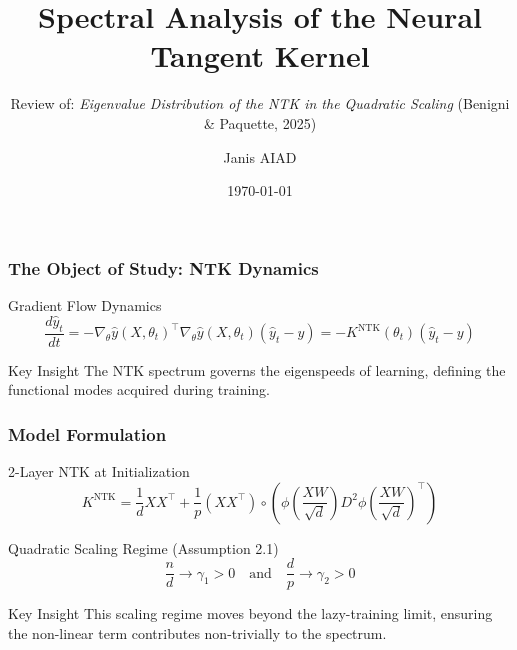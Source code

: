\documentclass[10pt]{beamer}
\title{Spectral Analysis of the Neural Tangent Kernel}
\subtitle{Review of: \textit{Eigenvalue Distribution of the NTK in the Quadratic Scaling} (Benigni \& Paquette, 2025)}
\author{Janis AIAD}
\institute{UMD}
\date{\today}
\begin{document}
\begin{frame}
    \titlepage
\end{frame}

\begin{frame}
    \frametitle{The Object of Study: NTK Dynamics}
    \begin{block}{Gradient Flow Dynamics}
        \begin{equation*}
            \frac{d\hat{y}_t}{dt} = - \nabla_\theta \hat{y}(X, \theta_t)^\top \nabla_\theta \hat{y}(X, \theta_t) (\hat{y}_t - y) = -K^{\text{NTK}}(\theta_t) (\hat{y}_t - y)
        \end{equation*}
    \end{block}
    \vspace{1cm}
    \begin{alertblock}{Key Insight}
    The NTK spectrum governs the eigenspeeds of learning, defining the functional modes acquired during training.
    \end{alertblock}
\end{frame}

\begin{frame}
    \frametitle{Model Formulation}
    \begin{block}{2-Layer NTK at Initialization}
        \begin{equation*}
            K^{\text{NTK}} = \frac{1}{d} XX^\top + \frac{1}{p} (XX^\top) \circ \left( \phi\left(\frac{XW}{\sqrt{d}}\right) D^2 \phi\left(\frac{XW}{\sqrt{d}}\right)^\top \right)
        \end{equation*}
    \end{block}
    \begin{exampleblock}{Quadratic Scaling Regime (Assumption 2.1)}
        \begin{equation*}
            \frac{n}{d} \to \gamma_1 > 0 \quad \text{and} \quad \frac{d}{p} \to \gamma_2 > 0
        \end{equation*}
    \end{exampleblock}
    \begin{alertblock}{Key Insight}
    This scaling regime moves beyond the lazy-training limit, ensuring the non-linear term contributes non-trivially to the spectrum.
    \end{alertblock}
\end{frame}
\end{document}
